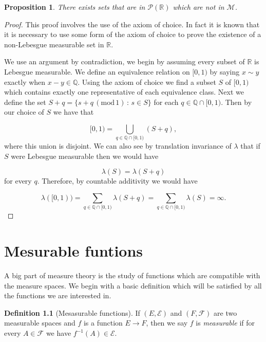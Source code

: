 \documentclass[
]{book}
\newtheorem{proposition}{Proposition}[chapter]
\theoremstyle{definition}
\newtheorem{definition}{Definition}[chapter]
\theoremstyle{definition}
\theoremstyle{definition}
\theoremstyle{definition}
\theoremstyle{remark}
\begin{document}
\begin{proposition}
There exists sets that are in \(\mathscr{P}(\mathbb{R})\) which are not in \(\mathscr{M}\).
\end{proposition}

\begin{proof}
This proof involves the use of the axiom of choice. In fact it is known that it is necessary to use some form of the axiom of choice to prove the existence of a non-Lebesgue measurable set in \(\mathbb{R}\).

We use an argument by contradiction, we begin by assuming every subset of \(\mathbb{R}\) is Lebesgue measurable. We define an equivalence relation on \([0,1)\) by saying \(x \sim y\) exactly when \(x-y \in \mathbb{Q}\). Using the axiom of choice we find a subset \(S\) of \([0,1)\) which contains exactly one representative of each equivalence class. Next we define the set \(S+q = \{ s+q \, (\mbox{mod}\,1) \, : \, s \in S \}\) for each \(q \in \mathbb{Q} \cap [0,1)\). Then by our choice of \(S\) we have that

\[ [0,1) = \bigcup_{q \in \mathbb{Q} \cap [0,1)} (S+q), \]
where this union is disjoint. We can also see by translation invariance of \(\lambda\) that if \(S\) were Lebesgue measurable then we would have

\[ \lambda(S) = \lambda(S+q) \]
for every \(q\). Therefore, by countable additivity we would have

\[ \lambda([0,1)) = \sum_{q \in \mathbb{Q} \cap [0,1)} \lambda (S+q) = \sum_{q \in \mathbb{Q} \cap [0,1)} \lambda(S) = \infty. \]
\end{proof}

\hypertarget{mesurable-funtions}{%
\chapter{Mesurable funtions}\label{mesurable-funtions}}

A big part of measure theory is the study of functions which are compatible with the measure spaces. We begin with a basic definition which will be satisfied by all the functions we are interested in.

\begin{definition}[Mesasurable functions]
If \((E, \mathcal{E})\) and \((F, \mathcal{F})\) are two measurable spaces and \(f\) is a function \(E \rightarrow F\), then we say \(f\) is \emph{measurable} if for every \(A \in \mathcal{F}\) we have \(f^{-1}(A) \in \mathcal{E}\).
\end{definition}
\end{document}
